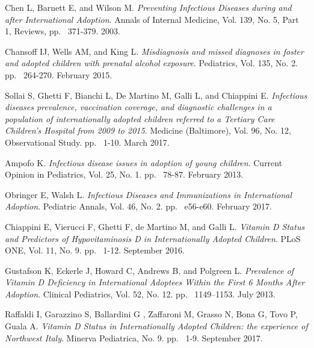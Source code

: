 \begin{thebibliography}{50}
  Chen L, Barnett E, and Wilson M.
  \textit{Preventing Infectious Diseases during and after International Adoption}.
  Annals of Internal Medicine, Vol. 139, No. 5, Part 1,
  Reviews,
  pp. ~371-379.
  2003.
  
  Chansoff IJ, Wells AM, and King L.
  \textit{Misdiagnosis and missed diagnoses in foster and adopted children with prenatal alcohol exposure}.
  Pediatrics, Vol. 135, No. 2.
  pp. ~264-270.
  February 2015.
  
  Sollai S, Ghetti F, Bianchi L, De Martino M, Galli L, and Chiappini E.
  \textit{Infectious diseases prevalence, vaccination coverage, and diagnostic challenges in a population of internationally adopted children referred to a Tertiary Care Children’s Hospital from 2009 to 2015}.
  Medicine (Baltimore), Vol. 96, No. 12,
  Observational Study.
  pp. ~1-10.
  March 2017.
  
  Ampofo K.
  \textit{Infectious disease issues in adoption of young children}.
  Current Opinion in Pediatrics, Vol. 25, No. 1.
  pp. ~78-87.
  February 2013.
  
  Obringer E, Walsh L.
  \textit{Infectious Diseases and Immunizations in International Adoption}.
  Pediatric Annals, Vol. 46, No. 2.
  pp. ~e56-e60.
  February 2017.
  
  Chiappini E, Vierucci F, Ghetti F, de Martino M, and Galli L.
  \textit{Vitamin D Status and Predictors of Hypovitaminosis D in Internationally Adopted Children}.
  PLoS ONE, Vol. 11, No. 9.
  pp. ~1-12.
  September 2016.
  
  Gustafson K, Eckerle J, Howard C, Andrews B, and Polgreen L.
  \textit{Prevalence of Vitamin D Deficiency in International Adoptees Within the First 6 Months After Adoption}.
  Clinical Pediatrics, Vol. 52, No. 12.
  pp. ~1149–1153.
  July 2013.
  
  Raffaldi I, Garazzino S, Ballardini G , Zaffaroni M, Grasso N, Bona G, Tovo P, Guala A.
  \textit{Vitamin D Status in Internationally Adopted Children: the experience of Northwest Italy}.
  Minerva Pediatrica, No. 9.
  pp. ~1-9.
  September 2017.
  

\end{thebibliography}
